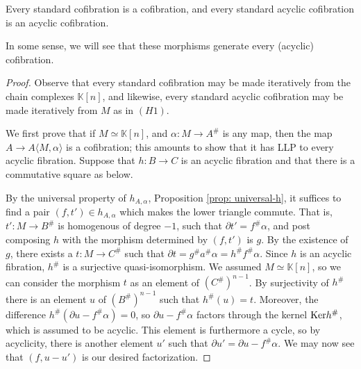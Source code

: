 \documentclass[../thesis.tex]{subfiles}
\begin{document}
            \begin{proposition}
                Every standard cofibration is a cofibration, and every standard acyclic cofibration is an acyclic cofibration.
            \end{proposition}

            \begin{remark}
                In some sense, we will see that these morphisms generate every (acyclic) cofibration.
            \end{remark}

            \begin{proof}
                Observe that every standard cofibration may be made iteratively from the chain complexes $\mathbb{K}[n]$, and likewise, every standard acyclic cofibration may be made iteratively from $M$ as in $(H1)$.

                We first prove that if $M \simeq \mathbb{K}[n]$, and $\alpha: M \rightarrow A^\#$ is any map, then the map $A \rightarrow A\langle M,\alpha\rangle$ is a cofibration; this amounts to show that it has LLP to every acyclic fibration. Suppose that $h: B \rightarrow C$ is an acyclic fibration and that there is a commutative square as below.
                \begin{center}
                \end{center}
                
                By the universal property of $h_{A,\alpha}$, Proposition \ref{prop: universal-h}, it suffices to find a pair $(f,t')\in h_{A,\alpha}$ which makes the lower triangle commute. That is, $t' : M \rightarrow B^\#$ is homogenous of degree $-1$, such that $\partial t' = f^\#\alpha$, and post composing $h$ with the morphism determined by $(f,t')$ is $g$. By the existence of $g$, there exists a $t : M \rightarrow C^\#$ such that $\partial t = g^\#a^\#\alpha = h^\#f^\#\alpha$. Since $h$ is an acyclic fibration, $h^\#$ is a surjective quasi-isomorphism. We assumed $M \simeq \mathbb{K}[n]$, so we can consider the morphism $t$ as an element of $(C^{\#})^{n-1}$. By surjectivity of $h^\#$ there is an element $u$ of $(B^{\#})^{n-1}$ such that $h^\#(u) = t$. Moreover, the difference $h^\#(\partial u - f^\#\alpha) = 0$, so $\partial u - f^\#\alpha$ factors through the kernel $\tt{Ker} h^\#$, which is assumed to be acyclic. This element is furthermore a cycle, so by acyclicity, there is another element $u'$ such that $\partial u' = \partial u - f^\#\alpha$. We may now see that $(f, u - u')$ is our desired factorization.
                

\end{proof}
\end{document}
